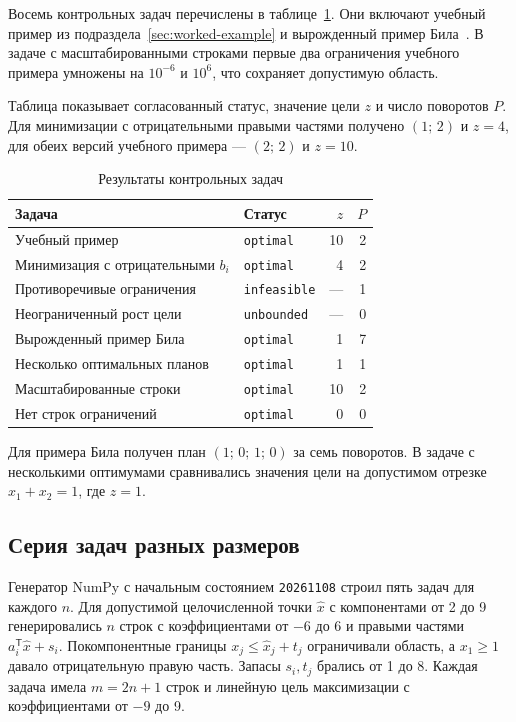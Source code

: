 Восемь контрольных задач перечислены в таблице~\ref{tab:experiment-controls}.
Они включают учебный пример из подраздела~\ref{sec:worked-example}
и вырожденный пример Била~\cite[с.~127]{kolman1995}. В задаче с
масштабированными строками первые два ограничения учебного примера
умножены на $10^{-6}$ и $10^6$, что сохраняет допустимую область.

Таблица показывает согласованный статус, значение цели $z$ и число
поворотов $P$. Для минимизации с отрицательными правыми частями получено
$(1;\,2)$ и $z=4$, для обеих версий учебного примера --- $(2;\,2)$ и $z=10$.

\begin{table}[htbp]
  \caption{Результаты контрольных задач}
  \label{tab:experiment-controls}
  \begin{tabularx}{\textwidth}{@{}>{\raggedright\arraybackslash}X l r r@{}}
    \toprule
    Задача & Статус & $z$ & $P$ \\
    \midrule
    Учебный пример & \texttt{optimal} & 10 & 2 \\
    Минимизация с отрицательными $b_i$ & \texttt{optimal} & 4 & 2 \\
    Противоречивые ограничения & \texttt{infeasible} & --- & 1 \\
    Неограниченный рост цели & \texttt{unbounded} & --- & 0 \\
    Вырожденный пример Била & \texttt{optimal} & 1 & 7 \\
    Несколько оптимальных планов & \texttt{optimal} & 1 & 1 \\
    Масштабированные строки & \texttt{optimal} & 10 & 2 \\
    Нет строк ограничений & \texttt{optimal} & 0 & 0 \\
    \bottomrule
  \end{tabularx}
\end{table}

Для примера Била получен план $(1;\,0;\,1;\,0)$ за семь поворотов.
В задаче с несколькими оптимумами сравнивались значения цели на
допустимом отрезке $x_1+x_2=1$, где $z=1$.

\subsection{Серия задач разных размеров}

Генератор NumPy с начальным состоянием \texttt{20261108} строил пять
задач для каждого $n$. Для допустимой целочисленной точки $\widehat{x}$
с компонентами от 2 до 9 генерировались $n$ строк с коэффициентами
от $-6$ до $6$ и правыми частями $a_i^{\mathsf T}\widehat{x}+s_i$.
Покомпонентные границы $x_j\le\widehat{x}_j+t_j$ ограничивали область,
а $x_1\ge 1$ давало отрицательную правую часть. Запасы $s_i,t_j$ брались
от 1 до 8. Каждая задача имела $m=2n+1$ строк и линейную цель
максимизации с коэффициентами от $-9$ до 9.

